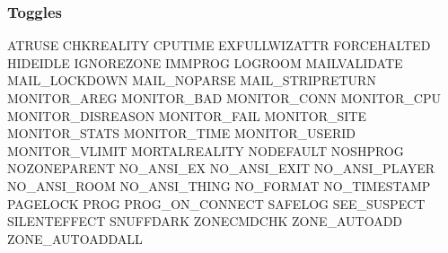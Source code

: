 \documentclass[letterpaper,10pt,english]{sphinxmanual}
\begin{document}
\subsubsection{Toggles}
\label{\detokenize{differences:toggles}}
\sphinxAtStartPar
ATRUSE                       CHKREALITY                    CPUTIME
EXFULLWIZATTR                FORCEHALTED                   HIDEIDLE
IGNOREZONE                   IMMPROG                       LOGROOM
MAILVALIDATE                 MAIL\_LOCKDOWN                 MAIL\_NOPARSE
MAIL\_STRIPRETURN             MONITOR\_AREG                  MONITOR\_BAD
MONITOR\_CONN                 MONITOR\_CPU                   MONITOR\_DISREASON
MONITOR\_FAIL                 MONITOR\_SITE                  MONITOR\_STATS
MONITOR\_TIME                 MONITOR\_USERID                MONITOR\_VLIMIT
MORTALREALITY                NODEFAULT                     NOSHPROG
NOZONEPARENT                 NO\_ANSI\_EX                    NO\_ANSI\_EXIT
NO\_ANSI\_PLAYER               NO\_ANSI\_ROOM                  NO\_ANSI\_THING
NO\_FORMAT                    NO\_TIMESTAMP                  PAGELOCK
PROG                         PROG\_ON\_CONNECT               SAFELOG
SEE\_SUSPECT                  SILENTEFFECT                  SNUFFDARK
ZONECMDCHK                   ZONE\_AUTOADD                  ZONE\_AUTOADDALL
\end{document}
